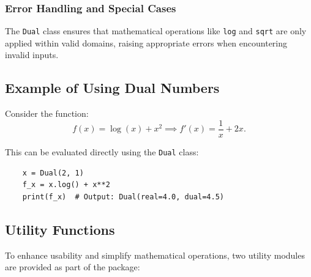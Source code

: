 \documentclass[a4paper,12pt]{article}
\begin{document}
    \subsubsection{Error Handling and Special Cases}
    The \texttt{Dual} class ensures that mathematical operations like \texttt{log} and \texttt{sqrt} are only applied within valid domains, raising appropriate errors when encountering invalid inputs.
    
    \subsection{Example of Using Dual Numbers}
    Consider the function:
    \begin{equation}
        f(x) = \log(x) + x^2 \implies f'(x) = \frac{1}{x} + 2x.
        \label{eq:derivative_example}
    \end{equation}
    
    This can be evaluated directly using the \texttt{Dual} class:
    \begin{verbatim}
    x = Dual(2, 1)
    f_x = x.log() + x**2
    print(f_x)  # Output: Dual(real=4.0, dual=4.5)
    \end{verbatim}
    
    \subsection{Utility Functions}
    
    To enhance usability and simplify mathematical operations, two utility modules are provided as part of the package:
    
\end{document}
